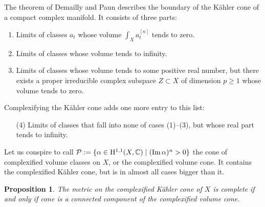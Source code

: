 \documentclass[11pt,a4paper]{amsart}
\newtheorem{prop}[theo]{Proposition}
\theoremstyle{definition}
\theoremstyle{remark}
\newcommand{\CC}{\mathbb{C}}
\def\Im{\mathop{\rm Im}}
\def\coho#1{\mathrm{H}^{#1}}
\def\^#1{^{[#1]}}
\begin{document}
The theorem of Demailly and Paun describes the boundary of the
K\"{a}hler cone of a compact complex manifold. It consists of three
parts:
\begin{enumerate}
\item Limits of classes $a_t$ whose volume $\int_X a_t\^n$
tends to zero.
\item Limits of classes whose volume tends to infinity.
\item Limits of classes whose volume tends to some positive real
number, but there exists a proper irreducible complex subspace $Z
\subset X$ of dimension $p \geq 1$ whose volume tends to zero.
\end{enumerate}
Complexifying the K\"{a}hler cone adds one more entry to this list:
\begin{enumerate}
\item[(4)] Limits of classes that fall into none of cases (1)--(3), but
whose real part tends to infinity.
\end{enumerate}

Let us conspire to call $\mathcal{P} := \{\alpha \in \coho{1,1}(X,\CC)
\mid (\Im\alpha)^n > 0\}$ the cone of complexified volume classes on
$X$, or the complexified volume cone. It contains the complexified
K\"{a}hler cone, but is in almost all cases bigger than it.

\begin{prop}
\label{prop:fofo}
The metric on the complexified K\"{a}hler cone of $X$ is complete if and
only if cone is a connected component of the complexified volume cone.
\end{prop}
\end{document}
